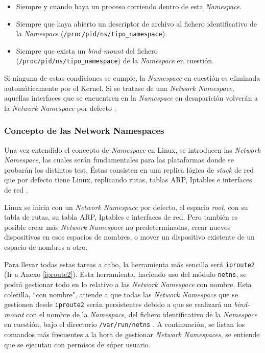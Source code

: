 \begin{itemize}
    \item Siempre y cuando haya un proceso corriendo dentro de esta \textit{Namespace}.
    \item Siempre que haya abierto un descriptor de archivo al fichero identificativo de la \textit{Namespace} (\texttt{/proc/{pid}/ns/{tipo\_namespace}}).
    \item Siempre que exista un \textit{bind-mount} del fichero (\texttt{/proc/{pid}/ns/{tipo\_namespace}}) de la \textit{Namespace} en cuestión.
\end{itemize}

Si ninguna de estas condiciones se cumple, la \textit{Namespace} en cuestión es eliminada automáticamente por el Kernel. Si se tratase de una \textit{Network Namespace}, aquellas interfaces que se encuentren en la \textit{Namespace} en desaparición volverán a la \textit{Network Namespace} por defecto \cite{ns}.

\subsubsection{Concepto de las Network Namespaces}

Una vez entendido el concepto de \textit{Namespace} en Linux, se introducen las \textit{Network Namespace}, las cuales serán fundamentales para las plataformas donde se probarán los distintos test. Éstas consisten en una replica lógica de \textit{stack} de red que por defecto tiene Linux, replicando rutas, tablas ARP, Iptables e interfaces de red \cite{netns}. \\
\par
 Linux se inicia con un \textit{Network Namespace} por defecto, el espacio \textit{root}, con su tabla de rutas, su tabla ARP,  Iptables e interfaces de red. Pero también es posible crear más \textit{Network Namespace} no predeterminadas,  crear nuevos dispositivos en esos espacios de nombres, o mover un dispositivo existente de un espacio de nombres a otro. \\
 \par
 Para llevar todas estas tareas a cabo, la herramienta más sencilla será \texttt{iproute2} (Ir a Anexo \ref{iproute2}). Esta herramienta, haciendo uso del módulo \texttt{netns}, se podrá gestionar todo en lo relativo a las \textit{Network Namespace} con nombre. Esta coletilla, ``con nombre", atiende a que todas las \textit{Network Namespace} que se gestionen desde \texttt{iproute2} serán persistentes debido a que se realizará un \textit{bind-mount} con el nombre de la \textit{Namespace}, del fichero identificativo de la \textit{Namespace} en cuestión, bajo el directorio \texttt{/var/run/netns} . A continuación, se listan los comandos más frecuentes a la hora de gestionar \textit{Network Namespaces}, se entiende que se ejecutan con permisos de súper usuario.
 
